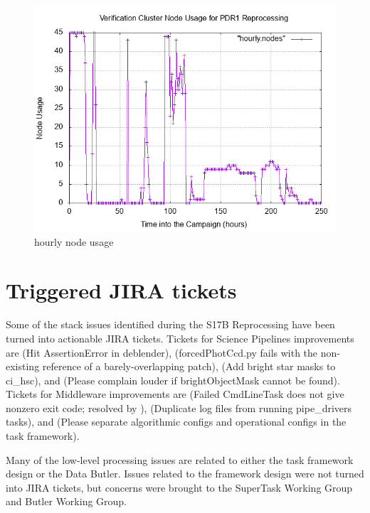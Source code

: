 \documentclass[DM,authoryear,toc]{lsstdoc}
\begin{document}
\begin{figure}[htbp]
        \begin{center}
                 \includegraphics[width=\textwidth]{figures/nodeUtilization}
                 \caption{hourly node usage \label{fig:node}}
        \end{center}
\end{figure}

\section{Triggered JIRA tickets}
Some of the stack issues identified during the S17B Reprocessing
have been turned into actionable JIRA tickets.
Tickets for Science Pipelines improvements are
 (Hit AssertionError in deblender),
 (forcedPhotCcd.py fails with the non-existing reference of a barely-overlapping patch),
 (Add bright star masks to ci{\_}hsc), and
 (Please complain louder if brightObjectMask cannot be found).
Tickets for Middleware improvements are
 (Failed CmdLineTask does not give nonzero exit code; resolved by \jira{}),
 (Duplicate log files from running pipe{\_}drivers tasks), and
 (Please separate algorithmic configs and operational configs in the task framework).

Many of the low-level processing issues are related to either the task framework design or the Data Butler.
Issues related to the framework design were not turned into JIRA tickets,
but concerns were brought to the SuperTask Working Group and Butler Working Group.



\end{document}

